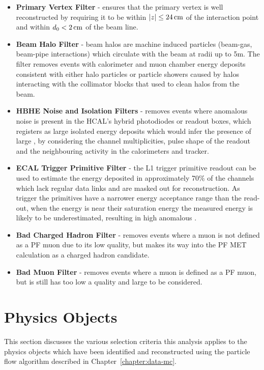 \begin{itemize}
\item \textbf{Primary Vertex Filter} - ensures that the primary vertex is well reconstructed by requiring it to be within $|z| \leq 24\,\text{cm}$ of the interaction point and within $d_{0} < 2\,\text{cm}$ of the beam line.
\item \textbf{Beam Halo Filter} - beam halos are machine induced particles (\eg beam-gas, beam-pipe interactions) which circulate with the beam at radii up to 5m. The filter removes events with calorimeter and muon chamber energy deposits consistent with either halo particles or particle showers caused by halos interacting with the collimator blocks that used to clean halos from the beam.
\item \textbf{HBHE Noise and Isolation Filters} - removes events where anomalous noise is present in the HCAL's hybrid photodiodes or readout boxes, which registers as large isolated energy deposits which would infer the presence of large \MET, by considering the channel multiplicities, pulse shape of the readout and the neighbouring activity in the calorimeters and tracker.
\item \textbf{ECAL Trigger Primitive Filter} - the L1 trigger primitive readout can be used to estimate the energy deposited in approximately 70\% of the channels which lack regular data links and are masked out for reconstruction. As trigger the primitives have a narrower energy acceptance range than the read-out, when the energy is near their saturation energy the measured energy is likely to be underestimated, resulting in high anomalous \MET. 
\item \textbf{Bad Charged Hadron Filter} - removes events where a muon is not defined as a PF muon due to its low quality, but makes its way into the PF MET calculation as a charged hadron candidate.
\item \textbf{Bad Muon Filter} - removes events where a muon is defined as a PF muon, but is still has too low a quality and large \pT to be considered.
\end{itemize}

\section{Physics Objects}\label{sec:eventSelection}
This section discusses the various selection criteria this analysis applies to the physics objects which have been identified and reconstructed using the particle flow algorithm described in Chapter~\ref{chapter:data-mc}.

